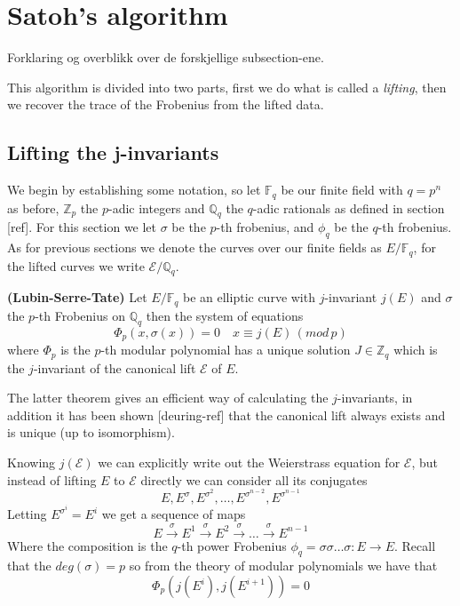 \section{Satoh's algorithm}
Forklaring og overblikk over de forskjellige subsection-ene.

This algorithm is divided into two parts, first we do what is called a \emph{lifting}, then
we recover the trace of the Frobenius from the lifted data.

\subsection{Lifting the j-invariants}
We begin by establishing some notation, so let $\mathbb{F}_q$ be our finite field with $q=p^n$ as before,
$\mathbb{Z}_p$ the $p$-adic integers and $\mathbb{Q}_q$ the $q$-adic rationals as defined in section [ref].
For this section we let $\sigma$ be the $p$-th frobenius, and $\phi_q$ be the $q$-th frobenius.
As for previous sections we denote the curves over our finite fields as $E/\mathbb{F}_q$,
for the lifted curves we write $\mathscr{E}/\mathbb{Q}_q$.

\begin{thm}
 \textbf{(Lubin-Serre-Tate)} Let $E/\mathbb{F}_q$ be an elliptic curve with $j$-invariant $j(E)$ and
$\sigma$ the $p$-th Frobenius on $\mathbb{Q}_q$ then the system of equations
$$ \Phi_p(x, \sigma(x)) = 0 \quad x \equiv j(E) \, (mod\, p)$$
where $\Phi_p$ is the $p$-th modular polynomial has a unique solution $J \in \mathbb{Z}_q$ 
which is the $j$-invariant of the canonical lift $\mathscr{E}$ of $E$.
\end{thm}
The latter theorem gives an efficient way of calculating the $j$-invariants, in addition it has
been shown [deuring-ref] that the canonical lift always exists and is unique (up to isomorphism).

Knowing $j(\mathscr{E})$ we can explicitly write out the Weierstrass equation for $\mathscr{E}$, but
instead of lifting $E$ to $\mathscr{E}$ directly we can consider all its conjugates
$$E, E^\sigma, E^{\sigma^2}, \ldots, E^{\sigma^{n-2}}, E^{\sigma^{n-1}} $$
Letting $E^{\sigma^i} = E^i $ we get a sequence of maps
$$ E \overset{\sigma}{\rightarrow} E^1 \overset{\sigma}{\rightarrow} E^2 \overset{\sigma}{\rightarrow}
\ldots \overset{\sigma}{\rightarrow} E^{n-1} $$
Where the composition is the $q$-th power Frobenius $\phi_q = \sigma \sigma \ldots \sigma: E \rightarrow E$.
Recall that the $deg(\sigma) = p$ so from the theory of modular polynomials we have that
$$ \Phi_p(j(E^i), j(E^{i+1})) = 0 $$

